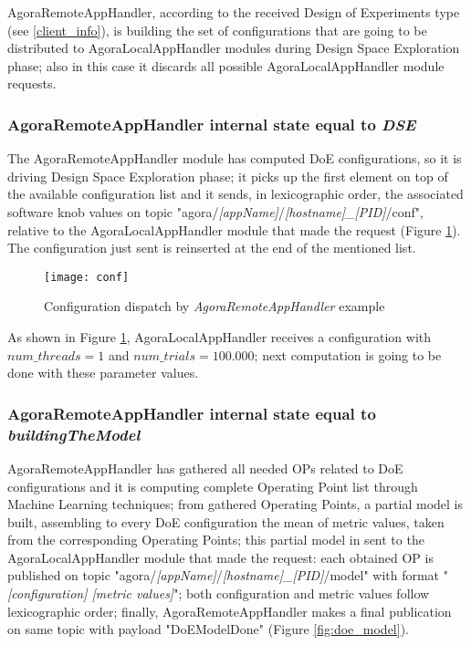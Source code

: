 AgoraRemoteAppHandler, according to the received Design of Experiments type (see \ref{client_info}), is building the set of configurations that are going to be distributed to AgoraLocalAppHandler modules during Design Space Exploration phase; also in this case it discards all possible AgoraLocalAppHandler module requests.


\subsubsection{AgoraRemoteAppHandler internal state equal to \textit{DSE}}\label{dse_conf}

The AgoraRemoteAppHandler module has computed DoE configurations, so it is driving Design Space Exploration phase; it picks up the first element on top of the available configuration list and it sends, in lexicographic order, the associated software knob values on topic "agora\slash{}\textit{[appName]}\slash{}\textit{[hostname]\_[PID]}\slash{}conf", relative to the AgoraLocalAppHandler module that made the request (Figure \ref{fig:conf}). The configuration just sent is reinserted at the end of the mentioned list.

\begin{figure}[ht]

    \centering
    \texttt{[image: conf]}
    \caption{Configuration dispatch by \textit{AgoraRemoteAppHandler} example}
    \label{fig:conf}
    
\end{figure}

As shown in Figure \ref{fig:conf}, AgoraLocalAppHandler receives a configuration with $num\_threads = 1$ and $num\_trials = 100.000$; next computation is going to be done with these parameter values.


\subsubsection{AgoraRemoteAppHandler internal state equal to \textit{building\-The\-Model}}\label{DoEModelSend}

AgoraRemoteAppHandler has gathered all needed OPs related to DoE configurations and it is computing complete Operating Point list through Machine Learning techniques; from gathered Operating Points, a partial model is built, assembling to every DoE configuration the mean of metric values, taken from the corresponding Operating Points; this partial model in sent to the Agora\-Local\-App\-Handler module that made the request: each obtained OP is published on topic "agora\slash{}\textit{[appName]}\slash{}\textit{[hostname]\_[PID]}\slash{}mod\-el" with format "\textit{[configuration] [metric values]}"; both configuration and metric values follow lexicographic order; finally, AgoraRemoteAppHandler makes a final publication on same topic with payload "DoEModelDone" (Figure \ref{fig:doe_model}).

